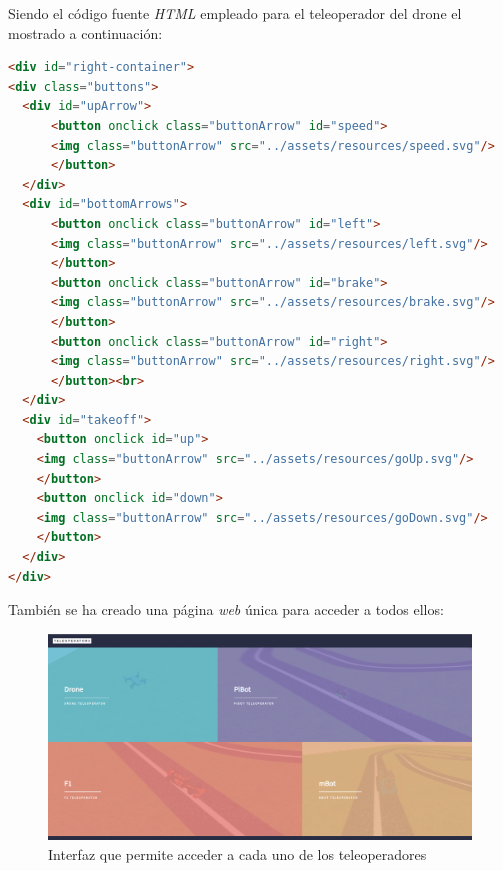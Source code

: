 Siendo el código fuente \textit{HTML} empleado para el teleoperador del drone el mostrado a continuación: 

\begin{lstlisting}[language=html,label=lst:teleop,caption=Código HTML del teleoperador del drone]
<div id="right-container">
<div class="buttons">
  <div id="upArrow">
      <button onclick class="buttonArrow" id="speed">
      <img class="buttonArrow" src="../assets/resources/speed.svg"/>
      </button>
  </div>
  <div id="bottomArrows">
      <button onclick class="buttonArrow" id="left">
      <img class="buttonArrow" src="../assets/resources/left.svg"/>
      </button>
      <button onclick class="buttonArrow" id="brake">
      <img class="buttonArrow" src="../assets/resources/brake.svg"/>
      </button>
      <button onclick class="buttonArrow" id="right">
      <img class="buttonArrow" src="../assets/resources/right.svg"/>
      </button><br>
  </div>
  <div id="takeoff">
    <button onclick id="up">
    <img class="buttonArrow" src="../assets/resources/goUp.svg"/>
    </button>
    <button onclick id="down">
    <img class="buttonArrow" src="../assets/resources/goDown.svg"/>
    </button>
  </div>
</div>
\end{lstlisting}

También se ha creado una página \textit{web}  única para acceder a todos ellos: 

 \begin{figure}[H]
    \centering
    \includegraphics[scale=0.25]{img/teleoperators.png}
    \caption{Interfaz que permite acceder a cada uno de los teleoperadores} \label{fig:teleoperators}
\end{figure}

